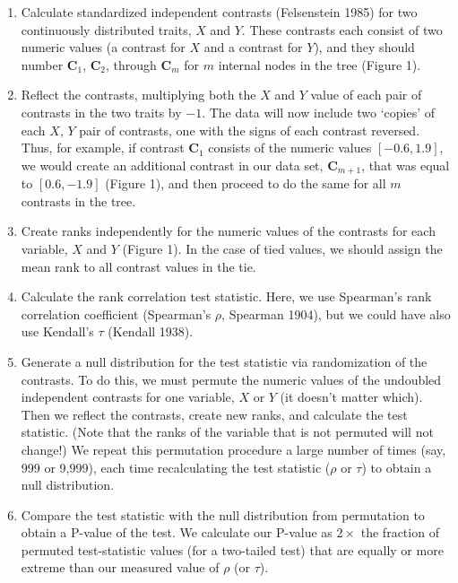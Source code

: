 \documentclass[fleqn,10pt,lineno]{wlpeerj} %
\begin{document}
\begin{enumerate}
\def\labelenumi{\arabic{enumi}.}
\item
  Calculate standardized independent contrasts (Felsenstein 1985) for two continuously distributed traits, \(X\) and \(Y\). These contrasts each consist of two numeric values (a contrast for \(X\) and a contrast for \(Y\)), and they should number \(\textbf{C}_1\), \(\textbf{C}_2\), through \(\textbf{C}_m\) for \(m\) internal nodes in the tree (Figure 1).
\item
  Reflect the contrasts, multiplying both the \(X\) and \(Y\) value of each pair of contrasts in the two traits by \(-1\). The data will now include two `copies' of each \(X\), \(Y\) pair of contrasts, one with the signs of each contrast reversed. Thus, for example, if contrast \(\textbf{C}_1\) consists of the numeric values \([-0.6,1.9]\), we would create an additional contrast in our data set, \(\textbf{C}_{m+1}\), that was equal to \([0.6,-1.9]\) (Figure 1), and then proceed to do the same for all \(m\) contrasts in the tree.
\item
  Create ranks independently for the numeric values of the contrasts for each variable, \(X\) and \(Y\) (Figure 1). In the case of tied values, we should assign the mean rank to all contrast values in the tie.
\item
  Calculate the rank correlation test statistic. Here, we use Spearman's rank correlation coefficient (Spearman's \(\rho\), Spearman 1904), but we could have also use Kendall's \(\tau\) (Kendall 1938).
\item
  Generate a null distribution for the test statistic via randomization of the contrasts. To do this, we must permute the numeric values of the undoubled independent contrasts for one variable, \(X\) or \(Y\) (it doesn't matter which). Then we reflect the contrasts, create new ranks, and calculate the test statistic. (Note that the ranks of the variable that is not permuted will not change!) We repeat this permutation procedure a large number of times (say, 999 or 9,999), each time recalculating the test statistic (\(\rho\) or \(\tau\)) to obtain a null distribution.
\item
  Compare the test statistic with the null distribution from permutation to obtain a P-value of the test. We calculate our P-value as \(2 \times\) the fraction of permuted test-statistic values (for a two-tailed test) that are equally or more extreme than our measured value of \(\rho\) (or \(\tau\)).
\end{enumerate}
\end{document}
